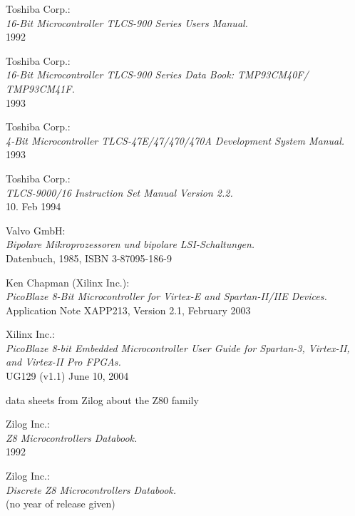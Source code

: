 \documentclass[12pt,twoside]{report}
\begin{document}
\begin{thebibliography}{99}
 Toshiba Corp.: \\
                  {\em 16-Bit Microcontroller TLCS-900 Series Users
                  Manual.\/} \\
                  1992

 Toshiba Corp.: \\
                   {\em 16-Bit Microcontroller TLCS-900 Series Data Book:
                    TMP93CM40F/ TMP93CM41F.\/} \\
                   1993

 Toshiba Corp.: \\
                 {\em 4-Bit Microcontroller TLCS-47E/47/470/470A Development
                  System Manual.\/} \\
                 1993

 Toshiba Corp.: \\
                   {\em TLCS-9000/16 Instruction Set Manual Version
                   2.2.\/} \\
                   10. Feb 1994

 Valvo GmbH: \\
                {\em Bipolare Mikroprozessoren und bipolare
                LSI-Schaltungen.\/} \\
                Datenbuch, 1985, ISBN 3-87095-186-9

 Ken Chapman (Xilinx Inc.):\\
                 {\em PicoBlaze 8-Bit Microcontroller for Virtex-E
                 and Spartan-II/IIE Devices.\/} \\
                 Application Note XAPP213, Version 2.1, February 2003

 Xilinx Inc.: \\
                 {\em PicoBlaze 8-bit Embedded Microcontroller User Guide
                 for Spartan-3, Virtex-II, and Virtex-II Pro FPGAs.\/} \\
                 UG129 (v1.1) June 10, 2004
                          
 data sheets from Zilog about the Z80 family

 Zilog Inc.: \\
                {\em Z8 Microcontrollers Databook.\/} \\
                1992

 Zilog Inc.: \\
                  {\em Discrete Z8 Microcontrollers Databook.\/} \\
                  (no year of release given)


\end{thebibliography}
\end{document}
